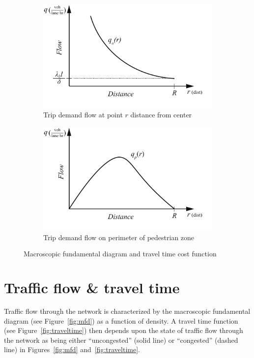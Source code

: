 \documentclass{article}
\begin{document}
\begin{figure}[!ht]
     \centering
     \hfill
     \begin{subfigure}[b]{0.45\textwidth}
         \centering
         \includegraphics[width=\textwidth]{diagram_flow_across}
         \caption{Trip demand flow at point $r$ distance from center}
         \label{fig:flowacross}
     \end{subfigure}
     \hfill
     \begin{subfigure}[b]{0.45\textwidth}
         \centering
         \includegraphics[width=\textwidth]{diagram_flow_perim}
         \caption{Trip demand flow on perimeter of pedestrian zone}
         \label{fig:perimflow}
     \end{subfigure}
     \hfill
     \caption{Macroscopic fundamental diagram and travel time cost function}
\end{figure}



\section{Traffic flow \& travel time}
Traffic flow through the network is characterized by the macroscopic fundamental diagram (see Figure~\ref{fig:mfd}) as a function of density. A travel time function (see Figure~\ref{fig:traveltime}) then depends upon the state of traffic flow through the network as being either ``uncongested'' (solid line) or ``congested'' (dashed line) in Figures~\ref{fig:mfd} and~\ref{fig:traveltime}.
\end{document}
